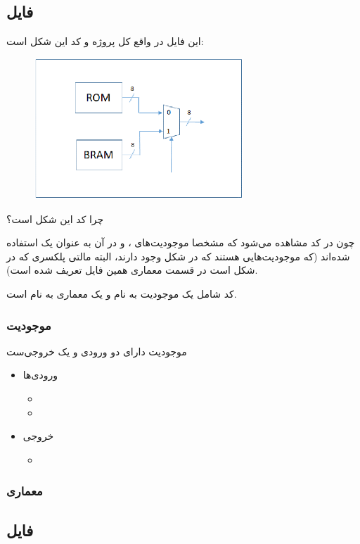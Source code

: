\documentclass[dvipsnames, svgnames, x11names, a4paper, 11pt]{article}
\begin{document}
\subsection{فایل }
این فایل در واقع کل پروژه و کد این شکل است:
\begin{figure}[H]
\begin{center}
\includegraphics[width=0.7\textwidth, height=0.3\textheight]{images/project}
\end{center}
\end{figure}
چرا کد این شکل است؟

چون در کد مشاهده‌ می‌شود که مشخصا موجودیت‌های 
،
و
در آن به عنوان یک 
استفاده شده‌اند (که موجودیت‌هایی هستند که در شکل وجود دارند، البته مالتی پلکسری که در شکل است در قسمت معماری همین فایل تعریف شده است).

کد شامل یک موجودیت به نام
و یک معماری به نام
است.

\subsubsection{موجودیت }
موجودیت دارای دو ورودی و یک خروجی‌ست
\begin{itemize}
\item 
ورودی‌ها

\begin{itemize}
\item {}

\item  {}
\end{itemize}

\item 
خروجی
\begin{itemize}
\item {}
\end{itemize}

\end{itemize}
\subsubsection{معماری }

\subsection{فایل }
\end{document}

